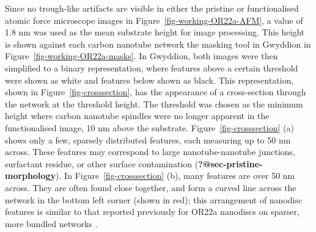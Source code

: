 \documentclass[
  a4paper,
]{scrbook}
\begin{document}
Since no trough-like artifacts are visible in either the pristine or
functionalised atomic force microscope images in
Figure~\ref{fig-working-OR22a-AFM}, a value of 1.8 nm was used as the
mean substrate height for image processing. This height is shown against
each carbon nanotube network the masking tool in Gwyddion in
Figure~\ref{fig-working-OR22a-masks}. In Gwyddion, both images were then
simplified to a binary representation, where features above a certain
threshold were shown as white and features below shown as black. This
representation, shown in Figure~\ref{fig-crosssection}, has the
appearance of a cross-section through the network at the threshold
height. The threshold was chosen as the minimum height where carbon
nanotube spindles were no longer apparent in the functionalised image,
10 nm above the substrate. Figure~\ref{fig-crosssection} (a) shows only
a few, sparsely distributed features, each measuring up to 50 nm across.
These features may correspond to large nanotube-nanotube junctions,
surfactant residue, or other surface contamination
(\textbf{?@sec-pristine-morphology}). In Figure~\ref{fig-crosssection}
(b), many features are over 50 nm across. They are often found close
together, and form a curved line across the network in the bottom left
corner (shown in red); this arrangement of nanodisc features is similar
to that reported previously for OR22a nanodiscs on sparser, more bundled
networks \autocite{Murugathas2019b}.
\end{document}

